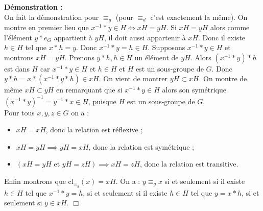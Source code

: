 \documentclass{article}
\begin{document}
\noindent\textbf{Démonstration :} \\[0.5em]
On fait la démonstration pour \(\equiv_g\) (pour \(\equiv_d\) c'est exactement la même). On montre en premier lieu que \(x^{-1} * y \in H \iff xH = yH\). Si \(xH = yH\) alors comme l'élément \(y * e_G\) appartient à \(yH\), il doit aussi appartenir à \(xH\). Donc il existe \(h \in H\) tel que \(x * h = y\). Donc \(x^{-1} * y = h \in H\). Supposons \(x^{-1} * y \in H\) et montrons \(xH = yH\). Prenons \(y * h, h \in H\) un élément de \(yH\). Alors \((x^{-1} * y) * h\) est dans \(H\) car \(x^{-1} * y \in H\) et \(h \in H\) et \(H\) est un sous-groupe de \(G\). Donc \(y * h = x * (x^{-1} * y * h) \in xH\). On vient de montrer \(yH \subset xH\). On montre de même \(xH \subset yH\) en remarquant que si \(x^{-1} * y \in H\) alors son symétrique \((x^{-1} * y)^{-1} = y^{-1} * x \in H\), puisque \(H\) est un sous-groupe de \(G\). \\
Pour tous \(x, y, z \in G\) on a :
\begin{itemize}
    \item \(xH = xH\), donc la relation est réflexive ;
    \item \(xH = yH \implies yH = xH\), donc la relation est symétrique ;
    \item \( (xH = yH \text{ et } yH = zH) \implies xH = zH\), donc la relation est transitive. 
\end{itemize}

Enfin montrons que \(\text{cl}_{\equiv_g}(x) = xH\). On a : \(y \equiv_g x\) si et seulement si il existe \(h \in H\) tel que \(x^{-1} * y = h\), si et seulement si il existe \(h \in H\) tel que \(y = x * h\), si et seulement si \(y \in xH\). \hfill \(\Box\)

\end{document}
